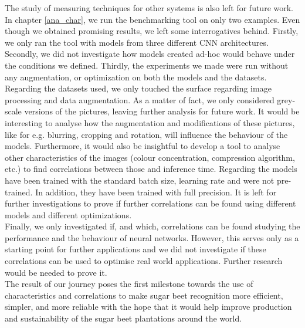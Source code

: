 The study of measuring techniques for other systems is also left for future work. \\
In chapter \ref{ana_char}, we run the benchmarking tool on only two examples. Even though we obtained promising results, we left some interrogatives behind. Firstly, we only ran the tool with models from three different CNN architectures. Secondly, we did not investigate how models created ad-hoc would behave under the conditions we defined. Thirdly, the experiments we made were run without any augmentation, or optimization on both the models and the datasets. Regarding the datasets used, we only touched the surface regarding image processing and data augmentation. As a matter of fact, we only considered grey-scale versions of the pictures, leaving further analysis for future work. It would be interesting to analyse how the augmentation and modifications of these pictures, like for e.g. blurring, cropping and rotation, will influence the behaviour of the models. Furthermore, it would also be insightful to develop a tool to analyse other characteristics of the images (colour concentration, compression algorithm, etc.) to find correlations between those and inference time. Regarding the models have been trained with the standard batch size, learning rate and were not pre-trained. In addition, they have been trained with full precision. It is left for further investigations to prove if further correlations can be found using different models and different optimizations.\\
Finally, we only investigated if, and which, correlations can be found studying the performance and the behaviour of neural networks. However, this serves only as a starting point for further applications and we did not investigate if these correlations can be used to optimise real world applications. Further research would be needed to prove it. \\
The result of our journey poses the first milestone towards the use of characteristics and correlations to make sugar beet recognition more efficient, simpler, and more reliable with the hope that it would help improve production and sustainability of the sugar beet plantations around the world. %

